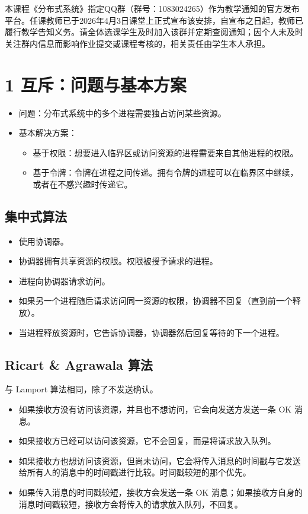 本课程《分布式系统》指定QQ群（群号：1083024265）作为教学通知的官方发布平台。任课教师已于2026年4月3日课堂上正式宣布该安排，自宣布之日起，教师已履行教学告知义务。请全体选课学生及时加入该群并定期查阅通知；因个人未及时关注群内信息而影响作业提交或课程考核的，相关责任由学生本人承担。

\section{1 互斥：问题与基本方案}

\begin{itemize}
\item 问题：分布式系统中的多个进程需要独占访问某些资源。
\item 基本解决方案：
  \begin{itemize}
  \item 基于权限：想要进入临界区或访问资源的进程需要来自其他进程的权限。
  \item 基于令牌：令牌在进程之间传递。拥有令牌的进程可以在临界区中继续，或者在不感兴趣时传递它。
  \end{itemize}
\end{itemize}

\subsection{集中式算法}

\begin{itemize}
\item 使用协调器。
\item 协调器拥有共享资源的权限。权限被授予请求的进程。
\item 进程向协调器请求访问。
\item 如果另一个进程随后请求访问同一资源的权限，协调器不回复（直到前一个释放）。
\item 当进程释放资源时，它告诉协调器，协调器然后回复等待的下一个进程。
\end{itemize}

\subsection{Ricart \& Agrawala 算法}

与 Lamport 算法相同，除了不发送确认。

\begin{itemize}
\item 如果接收方没有访问该资源，并且也不想访问，它会向发送方发送一条 OK 消息。
\item 如果接收方已经可以访问该资源，它不会回复，而是将请求放入队列。
\item 如果接收方也想访问该资源，但尚未访问，它会将传入消息的时间戳与它发送给所有人的消息中的时间戳进行比较。时间戳较短的那个优先。
\item 如果传入消息的时间戳较短，接收方会发送一条 OK 消息；如果接收方自身的消息时间戳较短，接收方会将传入的请求放入队列，不回复。
\end{itemize}

